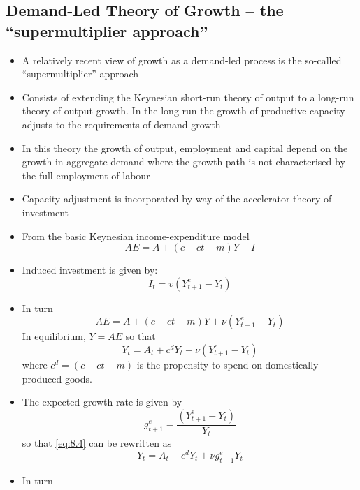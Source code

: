 \documentclass[a4paper,twoside]{article}
\numberwithin{equation}{section}
\numberwithin{figure}{section}
\begin{document}
\subsection{Demand-Led Theory of Growth -- the ``supermultiplier approach''}
\begin{itemize}
	\item A relatively recent view of growth as a demand-led process is the so-called ``supermultiplier'' approach
	\item Consists of extending the Keynesian short-run theory of output to a long-run theory of output growth. In the long run the growth of productive capacity adjusts to the requirements of demand growth
	\item In this theory the growth of output, employment and capital depend on the growth in aggregate demand where the growth path is not characterised by the full-employment of labour 
	\item Capacity adjustment is incorporated by way of the accelerator theory of investment
	\item From the basic Keynesian income-expenditure model
	\begin{equation}
		AE = A + (c - ct - m) Y + I \label{eq:8.1}
	\end{equation}
	\item Induced investment is given by:
	\begin{equation}
		I_t = v (Y_{t+1}^e - Y_t) \label{eq:8.2}
	\end{equation}
	\item In turn
	\begin{equation}
		AE = A + (c - ct - m) Y + \nu (Y_{t+1}^e - Y_t) \label{eq:8.3}
	\end{equation}
	In equilibrium, \( Y = AE \) so that
	\begin{equation}
		Y_t = A_t + c^d Y_t + \nu (Y_{t+1}^e - Y_t) \label{eq:8.4}
	\end{equation}
	where \( c^d = (c - ct - m) \) is the propensity to spend on domestically produced goods.
	\item The expected growth rate is given by
	\begin{equation}
		g_{t+1}^e = \frac{\left( Y_{t+1}^e - Y_t \right)}{Y_t} \label{eq:8.5}
	\end{equation}
	so that \cref{eq:8.4} can be rewritten as
	\begin{equation}
		Y_t = A_t + c^d Y_t + \nu g_{t+1}^e Y_t \label{eq:8.6}
	\end{equation}
	\item In turn

\end{itemize}
\end{document}

